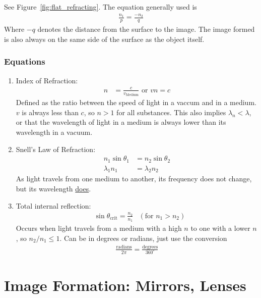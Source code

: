 \documentclass[a4paper,10pt]{report}
\begin{document}
See Figure~\ref{fig:flat_refracting}. The equation generally used is
\begin{align*}
  \frac{n_1}{p} = \frac{-n_2}{q}
\end{align*}
Where $-q$ denotes the distance from the surface to the image. The image formed is also always on the same side of the surface as the object itself.

\subsection{Equations}
\begin{enumerate}
  \item
    Index of Refraction:
    \begin{align*}
        n &= \frac{c}{v_{\text{Medium}}} \text{ or } vn=c
    \end{align*}
    Defined as the ratio between the speed of light in a vaccum and in a medium. $v$ is always less than $c$, so $n>1$ for all substances.
    This also implies $\lambda_n < \lambda$, or that the wavelength of light in a medium is always lower than its wavelength in a vacuum.

  \item
    Snell's Law of Refraction:
    \begin{align*}
    n_1\sin\theta_1 &= n_2\sin\theta_2 \\
    \lambda_1 n_1 &= \lambda_2 n_2
    \end{align*}
    As light travels from one medium to another, its frequency does not change, but its wavelength \underline{does}.

  \item
    Total internal reflection:
    \begin{align*}
     &\sin\theta_{\text{crit}} = \frac{n_2}{n_1} &(\text{for } n_1 > n_2)
    \end{align*}
    Occurs when light travels from a medium with a high $n$ to one with a lower $n$, so $n_2/n_1 \le 1$.
    Can be in degrees or radians, just use the conversion
    \begin{align*}
     \frac{\text{radians}}{2\pi} = \frac{\text{degrees}}{360^{\circ}}
    \end{align*}
\end{enumerate}

\chapter{Image Formation: Mirrors, Lenses}
\end{document}
